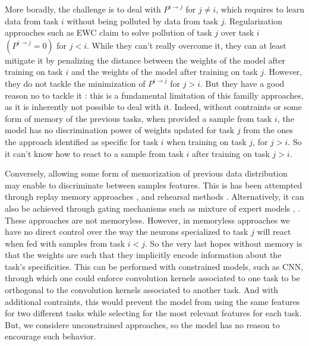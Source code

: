 \documentclass[11pt]{article}
\begin{document}
\vspace{1mm}
\noindent
More boradly, the challenge is to deal with $P^{i\rightarrow j}$ for $j \neq i$, which requires to learn data from task $i$ without being polluted by data from task $j$. Regularization approaches such as EWC claim to solve pollution of task $j$ over task $i$ $(P^{i\rightarrow j}=0)$ for $j<i$. While they can't really overcome it, they can at least mitigate it by penalizing the distance between the weights of the model after training on task $i$ and the weights of the model after training on task $j$. However, they do not tackle the minimization of $P^{i\rightarrow j}$ for $j>i$. But they have a good reason no to tackle it : this is a fundamental limitation of this familly approaches, as it is inherently not possible to deal with it. Indeed, without contraints or some form of memory of the previous tasks, when provided a sample from task $i$, the model has no discrimination power of weights updated for task $j$ from the ones the approach identified as specific for task $i$ when training on task $j$, for $j>i$. So it can't know how to react to a sample from task $i$ after training on task $j>i$.

\vspace{1mm}
\noindent
Conversely, allowing some form of memorization of previous data distribution may enable to discriminate between samples features. This is has been attempted through replay memory approaches \cite{replay1}, \cite{replay2} and rehearsal methods \cite{rehearsal}. Alternatively, it can also be achieved through gating mechanisms such as mixture of expert models \cite{moe}, \cite{dmoe}. These approaches are not memoryless. However, in memoryless approaches we have no direct control over the way the neurons specialized to task $j$ will react when fed with samples from task $i<j$. So the very last hopes without memory is that the weights are such that they implicitly encode information about the task's specificities. This can be performed with constrained models, such as CNN, through which one could enforce convolution kernels associated to one task to be orthogonal to the convolution kernels associated to another task. And with additional contraints, this would prevent the model from using the same features for two different tasks while selecting for the most relevant features for each task. But, we considere unconstrained approaches, so the model has no reason to encourage such behavior.
\end{document}
